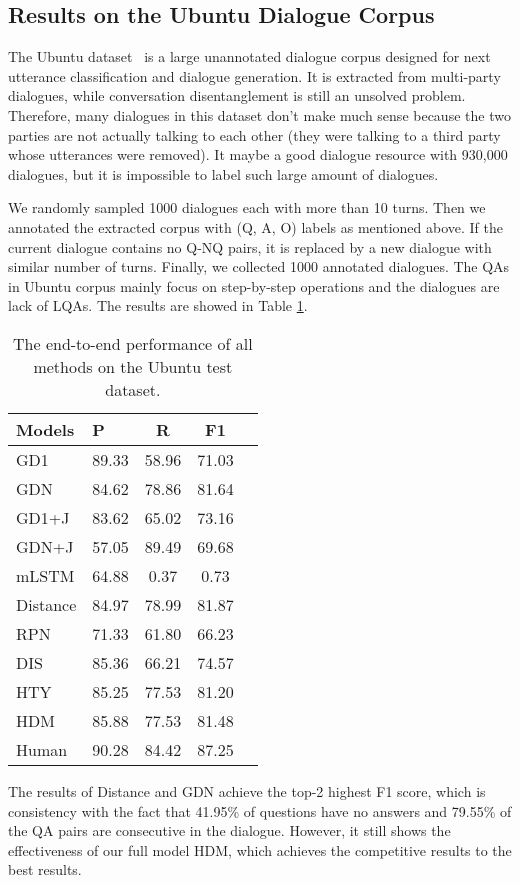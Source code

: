 \subsection{Results on the Ubuntu Dialogue Corpus}
\label{sec:uresults}

The Ubuntu dataset~\cite{lowe2015ubuntu} is a large unannotated dialogue corpus designed for next utterance classification and dialogue generation. It is extracted from multi-party dialogues, while conversation disentanglement is still an unsolved problem. 
Therefore, many dialogues in this dataset don't make much 
sense because the two parties are not actually talking to each other (they were
talking to a third party whose utterances were removed). 
It maybe a good dialogue resource with 930,000 dialogues, but it is 
impossible to label such large amount of dialogues.

We randomly sampled 1000 dialogues each with more than 10 turns. 
Then we annotated the extracted corpus with (Q, A, O) labels as mentioned above. 
If the current dialogue contains no Q-NQ pairs, it is replaced by a new dialogue 
with similar number of turns. Finally, we collected 1000 annotated dialogues. 
The QAs in Ubuntu corpus mainly focus on step-by-step operations and the dialogues are 
lack of LQAs. The results are showed in Table \ref{tab:mainResults-ubuntu}.

\begin{table}

	\centering
	\begin{tabular}{p{1cm}<{\centering}p{1cm}<{\centering}ccc}
		\toprule[1.5pt]
		Models &P&R& F1\\
		\midrule[1pt]
		GD1&89.33&58.96&71.03\\
		GDN  &84.62&78.86&81.64\\
		GD1+J&83.62&65.02&73.16\\
		GDN+J&57.05&89.49&69.68\\
		\hline
		mLSTM&64.88&0.37&0.73\\
		Distance&84.97&78.99&81.87\\
		RPN&71.33&61.80&66.23\\
		\hline
		DIS&85.36&66.21&74.57\\
		HTY&85.25&77.53&81.20\\
		HDM&85.88&77.53&81.48\\
		\hline
		Human &90.28&84.42&87.25\\
		\bottomrule[1.5pt]
	\end{tabular}
	\vspace{-0.25cm}
	\caption{The end-to-end performance of all methods on the Ubuntu test dataset.}
	\label{tab:mainResults-ubuntu}
\end{table}

The results of Distance and GDN achieve the top-2 highest F1 score, 
which is consistency with the fact that 41.95\% of questions have no answers 
and 79.55\% of the QA pairs are consecutive in the dialogue. 
However, it still shows the effectiveness of our full model HDM, 
which achieves the competitive results to the best results.

